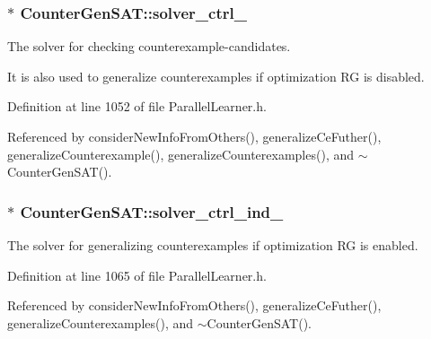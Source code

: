 \hypertarget{classCounterGenSAT_a8ed22d7411e62b13c50824664e58807a}{
\subsubsection[{solver\-\_\-ctrl\-\_\-}]{$\ast$ Counter\-Gen\-S\-A\-T\-::solver\-\_\-ctrl\-\_\-\hspace{0.3cm}{\ttfamily [protected]}}}\label{classCounterGenSAT_a8ed22d7411e62b13c50824664e58807a}


The solver for checking counterexample-\/candidates. 

It is also used to generalize counterexamples if optimization R\-G is disabled. 

Definition at line 1052 of file Parallel\-Learner.\-h.



Referenced by consider\-New\-Info\-From\-Others(), generalize\-Ce\-Futher(), generalize\-Counterexample(), generalize\-Counterexamples(), and $\sim$\-Counter\-Gen\-S\-A\-T().

\hypertarget{classCounterGenSAT_a33c1b5637bdd766a7d2b8ff2e3147eca}{
\subsubsection[{solver\-\_\-ctrl\-\_\-ind\-\_\-}]{$\ast$ Counter\-Gen\-S\-A\-T\-::solver\-\_\-ctrl\-\_\-ind\-\_\-\hspace{0.3cm}{\ttfamily [protected]}}}\label{classCounterGenSAT_a33c1b5637bdd766a7d2b8ff2e3147eca}


The solver for generalizing counterexamples if optimization R\-G is enabled. 



Definition at line 1065 of file Parallel\-Learner.\-h.



Referenced by consider\-New\-Info\-From\-Others(), generalize\-Ce\-Futher(), generalize\-Counterexamples(), and $\sim$\-Counter\-Gen\-S\-A\-T().

